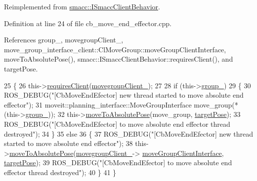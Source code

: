 Reimplemented from \hyperlink{classsmacc_1_1ISmaccClientBehavior_a3ec24a839087c550e1d62a81e48cf530}{smacc\+::\+I\+Smacc\+Client\+Behavior}.



Definition at line 24 of file cb\+\_\+move\+\_\+end\+\_\+effector.\+cpp.



References group\+\_\+, movegroup\+Client\+\_\+, move\+\_\+group\+\_\+interface\+\_\+client\+::\+Cl\+Move\+Group\+::move\+Group\+Client\+Interface, move\+To\+Absolute\+Pose(), smacc\+::\+I\+Smacc\+Client\+Behavior\+::requires\+Client(), and target\+Pose.


\begin{DoxyCode}
25 \{
26   this->\hyperlink{classsmacc_1_1ISmaccClientBehavior_a32b16e99e3b4cb289414203dc861a440}{requiresClient}(\hyperlink{classmove__group__interface__client_1_1CbMoveEndEffector_aec44abef326949b57872d68e7b495194}{movegroupClient\_});
27 
28   \textcolor{keywordflow}{if} (this->\hyperlink{classmove__group__interface__client_1_1CbMoveEndEffector_a91cf66e5db59f176ae7c811cc0ebfb91}{group\_})
29   \{
30       ROS\_DEBUG(\textcolor{stringliteral}{"[CbMoveEndEfector] new thread started to move absolute end effector"});
31       moveit::planning\_interface::MoveGroupInterface move\_group(*(this->\hyperlink{classmove__group__interface__client_1_1CbMoveEndEffector_a91cf66e5db59f176ae7c811cc0ebfb91}{group\_}));
32       this->\hyperlink{classmove__group__interface__client_1_1CbMoveEndEffector_a7850f5f9c6fbc040b77e8456a2ecee09}{moveToAbsolutePose}(move\_group, \hyperlink{classmove__group__interface__client_1_1CbMoveEndEffector_a645e7131ef58ab052efbadf53ea82c59}{targetPose});
33       ROS\_DEBUG(\textcolor{stringliteral}{"[CbMoveEndEfector] to move absolute end effector thread destroyed"});
34   \}
35   \textcolor{keywordflow}{else}
36   \{
37       ROS\_DEBUG(\textcolor{stringliteral}{"[CbMoveEndEfector] new thread started to move absolute end effector"});
38       this->\hyperlink{classmove__group__interface__client_1_1CbMoveEndEffector_a7850f5f9c6fbc040b77e8456a2ecee09}{moveToAbsolutePose}(\hyperlink{classmove__group__interface__client_1_1CbMoveEndEffector_aec44abef326949b57872d68e7b495194}{movegroupClient\_}->
      \hyperlink{classmove__group__interface__client_1_1ClMoveGroup_a5f0ea9b52695661b17605691168d1f31}{moveGroupClientInterface}, \hyperlink{classmove__group__interface__client_1_1CbMoveEndEffector_a645e7131ef58ab052efbadf53ea82c59}{targetPose});
39       ROS\_DEBUG(\textcolor{stringliteral}{"[CbMoveEndEfector] to move absolute end effector thread destroyed"});
40   \}
41 \}
\end{DoxyCode}
